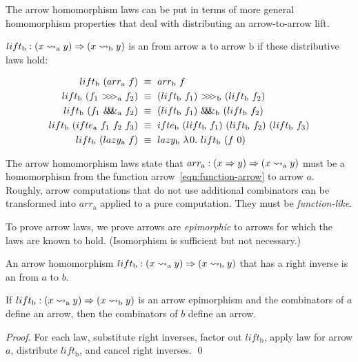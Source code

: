 \documentclass{llncs}
\newenvironment{displaybreaks}%
{%
	\begingroup%
	\allowdisplaybreaks%
}%
{%
	\endgroup%
	\ignorespacesafterend%
}
\newcommand{\arrow}{\rightsquigarrow}
\newcommand{\arrowlift}{\ensuremath{lift}}
\newcommand{\arrowarr}{\ensuremath{arr}}
\newcommand{\arrowcomp}{\ensuremath{{>}\mspace{-6mu}{>}\mspace{-6mu}{>}}}
\newcommand{\arrowpair}{\ensuremath{\mathit{\&\mspace{-7.5mu}\&\mspace{-7.5mu}\&}}}
\newcommand{\arrowif}{\ensuremath{ifte}}
\newcommand{\arrowlazy}{\ensuremath{lazy}}
\newcommand{\gen}{_\mathrm{a}}
\newcommand{\genb}{_\mathrm{b}}
\begin{document}
The arrow homomorphism laws can be put in terms of more general homomorphism properties that deal with distributing an arrow-to-arrow lift.

\begin{definition}
\label{def:arrow-homomorphism}
$lift\genb : (x \arrow\gen y) \tto (x \arrow\genb y)$ is an  from arrow $\mathrm{a}$ to arrow $\mathrm{b}$ if these distributive laws hold:
\begin{displaybreaks}
\begin{align}
	lift\genb~(\arrowarr\gen~f) &\ \equiv \ \arrowarr\genb~f
	\label{eqn:lift-distributes-over-arr}
\nobreak\\
	lift\genb~(f_1~\arrowcomp\gen~f_2) &\ \equiv \ (lift\genb~f_1)~\arrowcomp\genb~(lift\genb~f_2)
	\label{eqn:lift-distributes-over-comp}
\\
	lift\genb~(f_1~\arrowpair\gen~f_2) &\ \equiv \ (lift\genb~f_1)~\arrowpair\genb~(lift\genb~f_2)
	\label{eqn:lift-distributes-over-pair}
\\
	\arrowlift\genb~(\arrowif\gen~f_1~f_2~f_3) &\ \equiv \ 
		\arrowif\genb~(lift\genb~f_1)~(lift\genb~f_2)~(lift\genb~f_3)
	\label{eqn:lift-distributes-over-if}
\nobreak\\
	\arrowlift\genb~(\arrowlazy\gen~f) &\ \equiv \
		\arrowlazy\genb~\fun{0}{\arrowlift\genb~(f~0)}
	\label{eqn:lift-distributes-over-lazy}
\end{align}
\end{displaybreaks}
\end{definition}

The arrow homomorphism laws state that $\arrowarr\gen : (x \tto y) \tto (x \arrow\gen y)$ must be a homomorphism from the function arrow~\eqref{eqn:function-arrow} to arrow $a$.
Roughly, arrow computations that do not use additional combinators can be transformed into $\arrowarr\gen$ applied to a pure computation.
They must be \emph{function-like}.

To prove arrow laws, we prove arrows are \emph{epimorphic} to arrows for which the laws are known to hold.
(Isomorphism is sufficient but not necessary.)

\begin{definition}
\label{def:arrow-epimorphism}
An arrow homomorphism $\arrowlift\genb : (x \arrow\gen y) \tto (x \arrow\genb y)$ that has a right inverse is an  from $a$ to $b$.
\end{definition}

\begin{theorem}
\label{thm:arrow-epimorphism}
If $\arrowlift\genb : (x \arrow\gen y) \tto (x \arrow\genb y)$ is an arrow epimorphism and the combinators of $a$ define an arrow, then the combinators of $b$ define an arrow.
\end{theorem}
\begin{proof}
For each law, substitute right inverses, factor out $\arrowlift\genb$, apply law for arrow $a$, distribute $\arrowlift\genb$, and cancel right inverses.
\qed
\end{proof}
\end{document}
